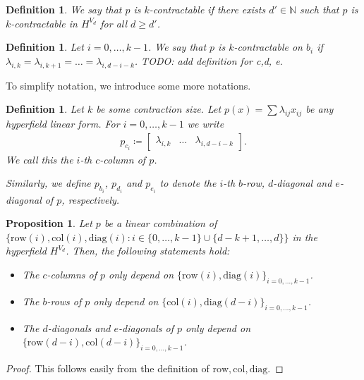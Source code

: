 \documentclass[11pt]{article}
\newtheorem{proposition}[theorem]{Proposition}
\newtheorem{definition}[theorem]{Definition}
\begin{document}
\begin{definition}
  We say that $p$ is $k$-contractable if there exists $d' \in \mathbb{N}$ such that $p$ is $k$-contractable in $H^{V_{d}}$ for all $d \geq d'$. 
\end{definition}

\begin{definition}
  Let $i = 0, \dots, k-1$.
  We say that $p$ is $k$-contractable on $b_{i}$ if $\lambda_{i,k} = \lambda_{i,k+1} = \dots = \lambda_{i,d-i-k}$. TODO: add definition for c,d, e.
\end{definition}

To simplify notation, we introduce some more notations.

\begin{definition}
  Let $k$ be some contraction size.
  Let $p(x) = \sum \lambda_{ij} x_{ij}$ be any hyperfield linear form. For $i = 0, \dots, k-1$ we write
\begin{align*}
  p_{c_{i}} \coloneqq \begin{bmatrix} \lambda_{i, k} & \dots & \lambda_{i,d-i-k} \end{bmatrix}. 
\end{align*}
We call this the $i$-th $c$-column of $p$.

 Similarly, we define $p_{b_{i}}$, $p_{d_{i}}$ and $p_{e_{i}}$ to denote the $i$-th $b$-row, $d$-diagonal and $e$-diagonal of $p$, respectively.
\end{definition}

\begin{proposition}
  Let $p$ be a linear combination of $\{ \mathrm{row}(i), \mathrm{col}(i), \mathrm{diag}(i) : i \in \{ 0, \dots, k-1\} \cup \{ d-k+1, \dots, d \} \}$ in the hyperfield $H^{V_{d}}$. Then, the following statements hold:
\begin{itemize}
\item The $c$-columns of $p$ only depend on $\{ \mathrm{row}(i), \mathrm{diag}(i) \}_{i = 0, \dots, k-1}$.
\item The $b$-rows of $p$ only depend on $\{ \mathrm{col}(i), \mathrm{diag}(d-i) \}_{i = 0, \dots, k-1}$.
\item The $d$-diagonals and $e$-diagonals of $p$ only depend on $\{ \mathrm{row}(d-i), \mathrm{col}(d-i) \}_{i = 0, \dots, k-1}$.
\end{itemize}
\end{proposition}

\begin{proof}
 This follows easily from the definition of $\mathrm{row}, \mathrm{col}, \mathrm{diag}$.
\end{proof}
\end{document}
